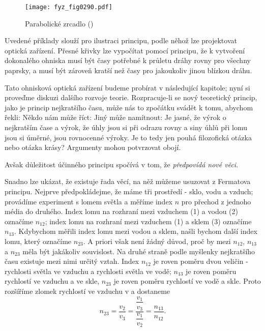     \begin{figure}[ht!] %
      \centering
      \texttt{[image: fyz\_fig0290.pdf]}
      \caption{Parabolické zrcadlo
               (\cite[s.~352]{Feynman01})}
      \label{fyz:fig0290}
    \end{figure}

    Uvedené příklady slouží pro ilustraci principu, podle něhož lze projektovat optická zařízení. 
    Přesné křivky lze vypočítat pomocí principu, že k vytvoření dokonalého ohniska musí být časy 
    potřebné k průletu dráhy rovny pro všechny paprsky, a musí být zároveň kratší než časy pro 
    jakoukoliv jinou blízkou dráhu.
    
    Tato ohnisková optická zařízení budeme probírat v následující kapitole; nyní si proveďme 
    diskuzi dalšího rozvoje teorie. Rozpracuje-li se nový teoretický princip, jako je princip 
    nejkratšího času, může nás to zpočátku svádět k tomu, abychom řekli:  Někdo nám 
    může říct:  Jiný může namítnout:  Je jasné, že výrok o nejkratším čase a výrok, že 
    úhly jsou si při odrazu rovny a siny úhlů při lomu jsou si úměrné, jsou rovnocenné výroky. Je 
    to tedy jen pouhá filozofická otázka nebo otázka krásy? Argumenty mohou potvrzovat obojí. 
    
    Avšak důležitost účinného principu spočívá v tom, že \emph{předpovídá nové věci}. 
    
    Snadno lze ukázat, že existuje řada věcí, na něž můžeme usuzovat z Fermatova principu. Nejprve 
    předpokládejme, že máme tři prostředí - sklo, vodu a vzduch; provádíme experiment s lomem 
    světla a měříme index \(n\) pro přechod z jednoho média do druhého. Index lomu na rozhraní mezi 
    vzduchem (1) a vodou (2) označíme \(n_{12}\); index lomu na rozhraní mezi vzduchem (1) a sklem 
    (3) označíme \(n_{13}\). Kdybychom měřili index lomu mezi vodou a sklem, našli bychom další 
    index lomu, který označíme \(n_{23}\). A priori však není žádný důvod, proč by mezi \(n_{12}\), 
    \(n_{13}\) a \(n_{23}\) měla být jakákoliv souvislost. Na druhé straně podle myšlenky 
    nejkratšího času existuje mezi nimi určitý vztah. Index \(n_{12}\) je roven poměru dvou veličin 
    - rychlosti světla ve vzduchu a rychlosti světla ve vodě; \(n_{13}\) je roven poměru rychlostí 
    ve vzduchu a ve skle, \(n_{23}\) je roven poměru rychlostí ve vodě a skle. Proto rozšíříme 
    zlomek rychlostí ve vzduchu v a dostaneme
    \begin{equation}\label{fyz:eq357}
      n_{23} = \frac{v_2}{v_3} = \dfrac{\dfrac{v_1}{v_3}}{\dfrac{v_1}{v_2}} = \frac{n_{13}}{n_{12}}.
    \end{equation}
    
